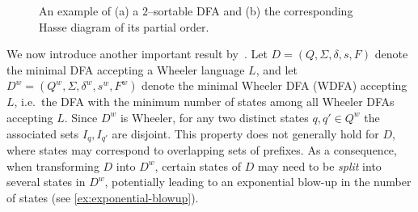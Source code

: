 \begin{example}
\begin{figure}[H]
\begin{subfigure}[b]{0.6\textwidth}
            \caption{}
            \label{fig:non_wheeler_graph_example}
        \end{subfigure}%
        \hfill
        \begin{subfigure}[b]{0.35\textwidth}
            \centering
            \caption{}
            \label{fig:non_wheeler_graph_poset}
        \end{subfigure}
        \caption{An example of (a) a $2$--sortable DFA and (b) the corresponding Hasse diagram of its partial order.}
        \label{fig:non_wheeler_example}
    \end{figure}
\end{example}

We now introduce another important result by~\cite{manziniRationalConstructionWheeler2024}. Let $D = (Q, \Sigma, \delta, s, F)$ denote the minimal DFA accepting a Wheeler language $L$, and let $D^w = (Q^w, \Sigma, \delta^w, s^w, F^w)$ denote the minimal Wheeler DFA (WDFA) accepting $L$, i.e.\ the DFA with the minimum number of states among all Wheeler DFAs accepting $L$. Since $D^w$ is Wheeler, for any two distinct states $q, q' \in Q^w$ the associated sets $I_q, I_{q'}$ are disjoint. This property does not generally hold for $D$, where states may correspond to overlapping sets of prefixes. As a consequence, when transforming $D$ into $D^w$, certain states of $D$ may need to be \emph{split} into several states in $D^w$, potentially leading to an exponential blow-up in the number of states (see \cref{ex:exponential-blowup}).


